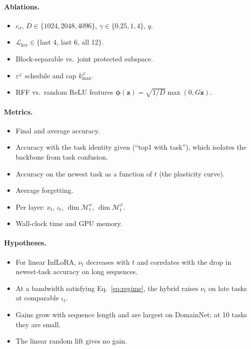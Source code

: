 \documentclass[11pt]{article}
\theoremstyle{plain}
\theoremstyle{definition}
\theoremstyle{remark}
\newcommand{\M}{\mathcal{M}}
\newcommand{\Lk}{\mathcal{L}_{\mathrm{ker}}}
\newcommand{\z}{\bm{z}}
\newcommand{\vphi}{\bm{\phi}}
\begin{document}
\paragraph{Ablations.}
\begin{itemize}[nosep]
\item $c_\sigma$, $D\in\{1024,2048,4096\}$, $\gamma\in\{0.25,1,4\}$, $q$.
\item $\Lk\in\{$last 4, last 6, all 12$\}$.
\item Block-separable vs.\ joint protected subspace.
\item $\varepsilon^\varphi$ schedule and cap $k^\varphi_{\max}$.
\item RFF vs.\ random ReLU features $\vphi(\z)=\sqrt{1/D}\max(0,G\z)$.
\end{itemize}

\paragraph{Metrics.}
\begin{itemize}[nosep]
\item Final and average accuracy.
\item Accuracy with the task identity given (``top1 with task''), which isolates the backbone from task confusion.
\item Accuracy on the newest task as a function of $t$ (the plasticity curve).
\item Average forgetting.
\item Per layer: $\nu_t$, $\iota_t$, $\dim\M^x_t$, $\dim\M^\varphi_t$.
\item Wall-clock time and GPU memory.
\end{itemize}

\paragraph{Hypotheses.}
\begin{itemize}[nosep]
\item[H1] For linear InfLoRA, $\nu_t$ decreases with $t$ and correlates with the drop in newest-task accuracy on long sequences.
\item[H2] At a bandwidth satisfying Eq.~\eqref{eq:regime}, the hybrid raises $\nu_t$ on late tasks at comparable $\iota_t$.
\item[H3] Gains grow with sequence length and are largest on DomainNet; at 10 tasks they are small.
\item[H4] The linear random lift gives no gain.
\end{itemize}
\end{document}
